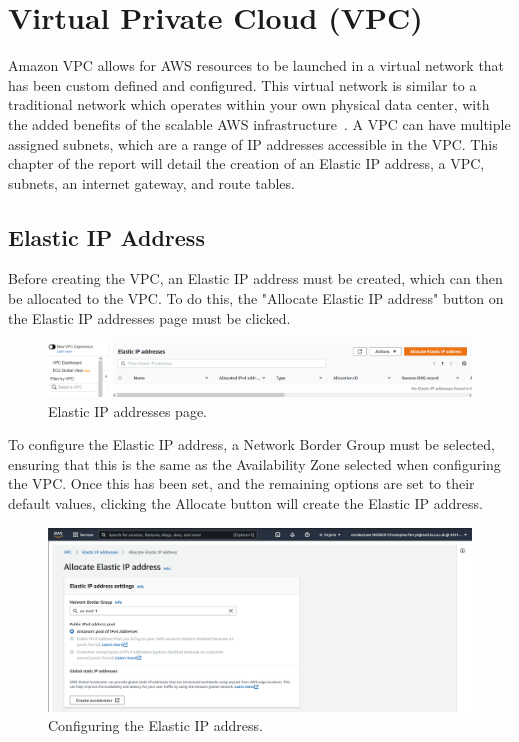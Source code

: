 \chapter{Virtual Private Cloud (VPC)}\label{ch:vpc}

Amazon VPC allows for AWS resources to be launched in a virtual network that has been custom defined and configured.
This virtual network is similar to a traditional network which operates within your own physical data center, with the
added benefits of the scalable AWS infrastructure~\parencite{amazon2022what}.
A VPC can have multiple assigned subnets, which are a range of IP addresses accessible in the VPC\@.
This chapter of the report will detail the creation of an Elastic IP address, a VPC, subnets, an internet gateway, and 
route tables.

\section{Elastic IP Address}\label{sec:elastic-ip-address}

Before creating the VPC, an Elastic IP address must be created, which can then be allocated to the VPC\@.
To do this, the "Allocate Elastic IP address" button on the Elastic IP addresses page must be clicked.

\begin{figure}[!htbp]
    \centering
    \includegraphics[width=\textwidth]{resources/vpc/blank_elastic}
    \caption{Elastic IP addresses page.}
    \label{fig:blank-elastic}
\end{figure}

To configure the Elastic IP address, a Network Border Group must be selected, ensuring that this is the same as the
Availability Zone selected when configuring the VPC\@.
Once this has been set, and the remaining options are set to their default values, clicking the Allocate button will
create the Elastic IP address.

\clearpage
\begin{figure}[!htbp]
    \centering
    \includegraphics[width=\textwidth]{resources/vpc/vpc_elastic_ip_addresses}
    \caption{Configuring the Elastic IP address.}
    \label{fig:config-elastic}
\end{figure}

